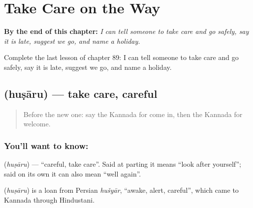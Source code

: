
\chapter{Take Care on the Way}
\label{ch:ka-take-care-on-the-way}

\begin{chapteropening}
\textbf{By the end of this chapter:} \emph{I can tell someone to take care and go safely, say it is late, suggest we go, and name a holiday.}

Complete the last lesson of chapter 89: I can tell someone to take care and go safely, say it is late, suggest we go, and name a holiday.
\end{chapteropening}

\section[\texorpdfstring{\kn{ಹುಷಾರು} (huṣāru)}{ಹುಷಾರು (huṣāru)}]{ (huṣāru) — take care, careful}

\label{lesson:KA-C89-takecare}



\begin{quote}
Before the new one: say the Kannada for come in, then the Kannada for welcome.
\end{quote}

\subsection*{You'll want to know: }
\textbf{} (\emph{huṣāru}) — \textquotedblleft{}careful, take care\textquotedblright{}. Said at parting it means \textquotedblleft{}look after yourself\textquotedblright{}; said on its own it can also mean \textquotedblleft{}well again\textquotedblright{}.

\begin{cousinweb}
\textbf{} (\emph{huṣāru}) is a loan from Persian \emph{hušyār}, \textquotedblleft{}awake, alert, careful\textquotedblright{}, which came to Kannada through Hindustani.
\end{cousinweb}

